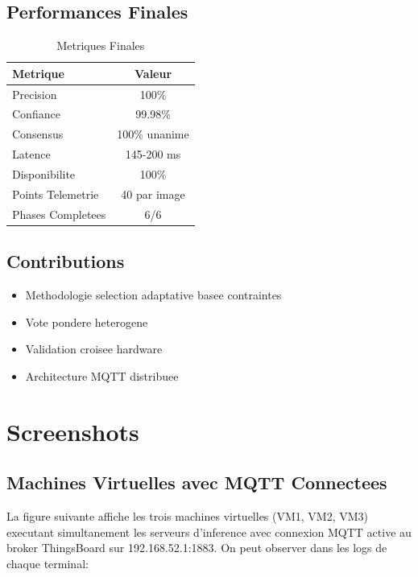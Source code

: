 \documentclass[12pt,a4paper]{report}
\begin{document}
\section{Performances Finales}

\begin{table}[H]
\centering
\begin{tabular}{|l|c|}
\hline
\textbf{Metrique} & \textbf{Valeur} \\
\hline
Precision & 100\% \\
Confiance & 99.98\% \\
Consensus & 100\% unanime \\
Latence & 145-200 ms \\
Disponibilite & 100\% \\
Points Telemetrie & 40 par image \\
Phases Completees & 6/6 \\
\hline
\end{tabular}
\caption{Metriques Finales}
\end{table}

\section{Contributions}

\begin{itemize}
    \item Methodologie selection adaptative basee contraintes
    \item Vote pondere heterogene
    \item Validation croisee hardware
    \item Architecture MQTT distribuee
\end{itemize}

\appendix

\chapter{Screenshots}

\section{Machines Virtuelles avec MQTT Connectees}

La figure suivante affiche les trois machines virtuelles (VM1, VM2, VM3) executant simultanement les serveurs d'inference avec connexion MQTT active au broker ThingsBoard sur 192.168.52.1:1883. On peut observer dans les logs de chaque terminal:
\end{document}
